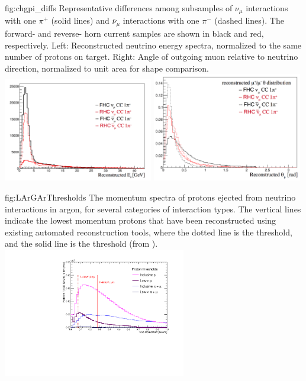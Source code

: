 \begin{dunefigure}{fig:chgpi_diffs}
{Representative differences among subsamples of  $\nu_{\mu}$ interactions with one $\pi^+$ (solid lines) and  $\bar{\nu}_{\mu}$ interactions with one $\pi^-$ (dashed lines). The forward- and reverse- horn current samples are shown in black and red, respectively. Left: Reconstructed neutrino energy spectra, normalized to the same number of protons on target. Right: Angle of outgoing muon relative to neutrino direction, normalized to unit area for shape comparison.}
    \includegraphics[width=0.49\textwidth]{graphics/Ereco_numu_1pi.png}
    \includegraphics[width=0.49\textwidth]{graphics/mu_theta_numu_6.png}
\end{dunefigure}


\begin{dunefigure} %
{fig:LArGArThresholds}
{The momentum spectra of protons ejected from neutrino interactions in argon, for several categories of interaction types. The vertical lines indicate the lowest momentum protons that have been reconstructed using existing automated reconstruction tools, where the dotted line is the  threshold, and the solid line is the  threshold (from ).}
    \includegraphics[width=0.6\textwidth]{graphics/Threshold.pdf}
\end{dunefigure}

